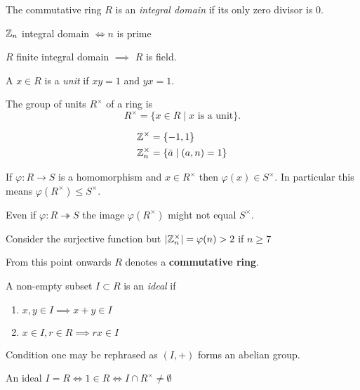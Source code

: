 \documentclass[master.tex]{subfiles}
\begin{document}
\begin{defn*}
  The commutative ring \(R\) is an \emph{integral domain} if its only zero divisor is \(0\).
\end{defn*}

\begin{example*}
  \({\mathbb Z}_n\) integral domain \(\iff n\) is prime
\end{example*}

\begin{prop*}
  \(R\) finite integral domain \(\implies\) \(R\) is field.
\end{prop*}

\begin{defn*}
  A \(x \in R\) is a \emph{unit} if \(xy=1\) and \(yx=1\).
\end{defn*}

\begin{defn*}
  The group of units \(R^\times\) of a ring is
  \[R^\times = \{x \in R \mid x\text{ is a unit}\}.\]
\end{defn*}

\begin{example*}
  \begin{align*}
    {\mathbb Z}^\times &= \{-1,1\}\\
    {\mathbb Z}_n^\times &= \{\bar{a} \mid (a,n)=1\}
  \end{align*}
\end{example*}

\begin{prop*}
  If \(\varphi \colon R \to S\) is a homomorphism and \(x \in R^{\times}\) then \(\varphi(x) \in S^\times\). In
  particular this means \(\varphi(R^\times) \le S^\times\).
\end{prop*}

Even if \(\varphi \colon R \twoheadrightarrow S\) the image \(\varphi(R^\times)\) might not equal \(S^\times\).

\begin{example*}
  Consider the surjective function  but \(|{\mathbb Z}_n^\times|=\varphi(n)>2\) if
  \(n \ge 7\)
\end{example*}

\begin{notation}
  From this point onwards \(R\) denotes a \textbf{commutative ring}.
\end{notation}

\begin{defn*}
  A non-empty subset \(I \subset R\) is an \emph{ideal} if
  \begin{enumerate}[label=(\roman*)]
  \item \(x,y \in I \implies x+y \in I \)
  \item \(x \in I, r \in R \implies rx \in I\)
  \end{enumerate}
\end{defn*}
Condition one may be rephrased as \((I,+)\) forms an abelian group.
\begin{prop*}
  An ideal \(I=R \iff 1 \in R \iff I \cap R^\times \neq \emptyset\)
\end{prop*}
\end{document}
